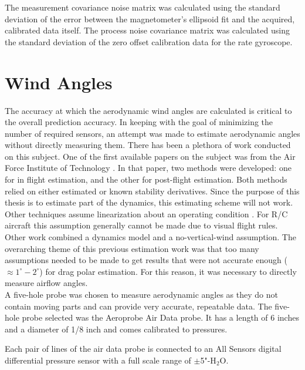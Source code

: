 The measurement covariance noise matrix was calculated using the standard deviation of the error between the magnetometer's ellipsoid fit and the acquired, calibrated data itself. The process noise covariance matrix was calculated using the standard deviation of the zero offset calibration data for the rate gyroscope.

\section{Wind Angles}
The accuracy at which the aerodynamic wind angles are calculated is critical to the overall prediction accuracy. In keeping with the goal of minimizing the number of required sensors, an attempt was made to estimate aerodynamic angles without directly measuring them. There has been a plethora of work conducted on this subject. One of the first available papers on the subject was from the Air Force Institute of Technology \cite{joseph1988}. In that paper, two methods were developed: one for in flight estimation, and the other for post-flight estimation. Both methods relied on either estimated or known stability derivatives. Since the purpose of this thesis is to estimate part of the dynamics, this estimating scheme will not work. Other techniques assume linearization about an operating condition \cite{morelli2012real}. For R/C aircraft this assumption generally cannot be made due to visual flight rules. Other work \cite{Lie2013} combined a dynamics model and a no-vertical-wind assumption. The overarching theme of this previous estimation work was that too many assumptions needed to be made to get results that were not accurate enough ($\approx1^\circ-2^\circ$) for drag polar estimation. For this reason, it was necessary to directly measure airflow angles.\\

A five-hole probe was chosen to measure aerodynamic angles as they do not contain moving parts and can provide very accurate, repeatable data. The five-hole probe selected was the Aeroprobe Air Data probe. It has a length of 6 inches and a diameter of 1/8 inch and comes calibrated to pressures.

 Each pair of lines of the air data probe is connected to an All Sensors digital differential pressure sensor with a full scale range of $\pm$5"-H$_2$O\cite{allsensorsDDO}.

